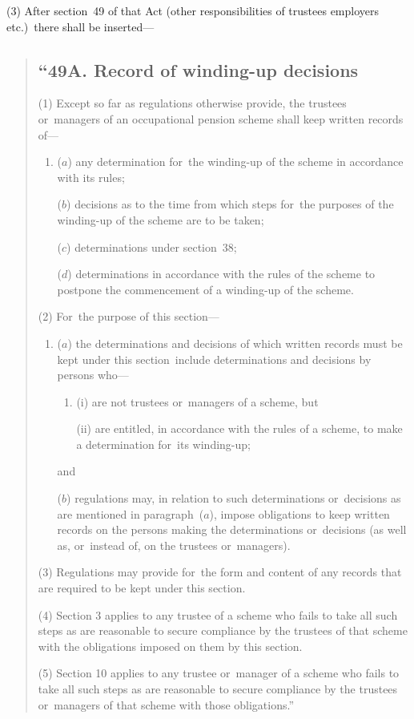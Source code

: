 \documentclass[12pt,a4paper]{article}
\begin{document}
(3) After section~49 of that Act (other responsibilities of trustees employers etc.)\ there shall be inserted—
\begin{quotation}
\subsection*{“49A. Record of winding-up decisions}

(1) Except so far as regulations otherwise provide, the trustees or~managers of an occupational pension scheme shall keep written records of—
\begin{enumerate}\item[]
($a$) any determination for~the winding-up of the scheme in accordance with its rules;

($b$) decisions as to the time from which steps for~the purposes of the winding-up of the scheme are to be taken;

($c$) determinations under section~38;

($d$) determinations in accordance with the rules of the scheme to postpone the commencement of a winding-up of the scheme.
\end{enumerate}

(2) For~the purpose of this section—
\begin{enumerate}\item[]
($a$) the determinations and decisions of which written records must be kept under this section~include determinations and decisions by persons who—
\begin{enumerate}\item[]
(i) are not trustees or~managers of a scheme, but

(ii) are entitled, in accordance with the rules of a scheme, to make a determination for~its winding-up;
\end{enumerate}
and

($b$) regulations may, in relation to such determinations or~decisions as are mentioned in paragraph~($a$), impose obligations to keep written records on the persons making the determinations or~decisions (as well as, or~instead of, on the trustees or~managers).
\end{enumerate}

(3) Regulations may provide for~the form and content of any records that are required to be kept under this section.

(4) Section 3 applies to any trustee of a scheme who fails to take all such steps as are reasonable to secure compliance by the trustees of that scheme with the obligations imposed on them by this section.

(5) Section 10 applies to any trustee or~manager of a scheme who fails to take all such steps as are reasonable to secure compliance by the trustees or~managers of that scheme with those obligations.”
\end{quotation}
\end{document}
